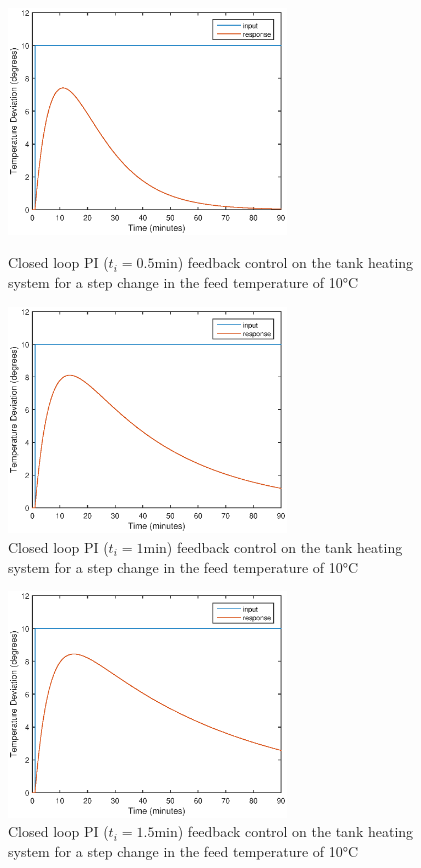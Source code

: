 \documentclass{article}
\begin{document}
\begin{figure}[h]
\begin{minipage}{0.45\textwidth}
\centering
\includegraphics[height=6cm]{3_sim_30}
\caption{Closed loop PI ($t_i=0.5\si{\minute}$) feedback control on the tank heating system for a step change in the feed temperature of 10$\si{\degreeCelsius}$}
\end{minipage}
\hspace{1cm}
\begin{minipage}{0.45\textwidth}
\centering
\includegraphics[height=6cm]{3_sim_60}
\caption{Closed loop PI ($t_i=1\si{\minute}$) feedback control on the tank heating system for a step change in the feed temperature of 10$\si{\degreeCelsius}$}
\end{minipage}
\end{figure}
\begin{figure}[h]
\centering
\includegraphics[height=6cm]{3_sim_90}
\caption{Closed loop PI ($t_i=1.5\si{\minute}$) feedback control on the tank heating system for a step change in the feed temperature of 10$\si{\degreeCelsius}$}
\end{figure}
\end{document}
